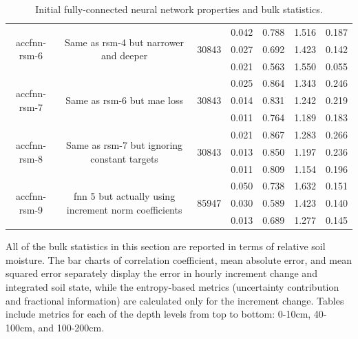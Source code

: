 \begin{table}[H]
\begin{sideways}
\begin{tabular}{c|c|c|c|c|c|c }
\hline
\multirow{3}{6em}{accfnn-rsm-6} & \multirow{3}{16em}{Same as rsm-4 but narrower and deeper} & \multirow{3}{4em}{30843} & 0.042 & 0.788 & 1.516 & 0.187 \\ & & & 0.027 & 0.692 & 1.423 & 0.142 \\ & & & 0.021 & 0.563 & 1.550 & 0.055 \\
\hline
\multirow{3}{6em}{accfnn-rsm-7} & \multirow{3}{16em}{Same as rsm-6 but mae loss} & \multirow{3}{4em}{30843} & 0.025 & 0.864 & 1.343 & 0.246 \\ & & & 0.014 & 0.831 & 1.242 & 0.219 \\ & & & 0.011 & 0.764 & 1.189 & 0.183 \\
\hline
\multirow{3}{6em}{accfnn-rsm-8} & \multirow{3}{16em}{Same as rsm-7 but ignoring constant targets} & \multirow{3}{4em}{30843} & 0.021 & 0.867 & 1.283 & 0.266 \\ & & & 0.013 & 0.850 & 1.197 & 0.236 \\ & & & 0.011 & 0.809 & 1.154 & 0.196 \\
\hline
\multirow{3}{6em}{accfnn-rsm-9} & \multirow{3}{16em}{fnn 5 but actually using increment norm coefficients} & \multirow{3}{4em}{85947} & 0.050 & 0.738 & 1.632 & 0.151 \\ & & & 0.030 & 0.589 & 1.423 & 0.140 \\ & & & 0.013 & 0.689 & 1.277 & 0.145 \\
    \end{tabular}
\end{sideways}
    \caption{Initial fully-connected neural network properties and bulk statistics.}
    \label{model-init-fnn-table}
\end{table}

All of the bulk statistics in this section are reported in terms of relative soil moisture. The bar charts of correlation coefficient, mean absolute error, and mean squared error separately display the error in hourly increment change and integrated soil state, while the entropy-based metrics (uncertainty contribution and fractional information) are calculated only for the increment change. Tables include metrics for each of the depth levels from top to bottom: 0-10cm, 40-100cm, and 100-200cm.

